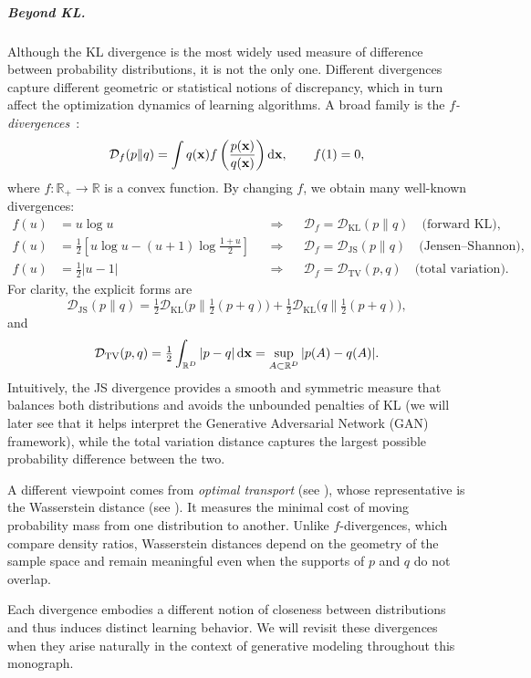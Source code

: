 \subparagraph{Beyond KL.} Although the KL divergence is the most widely used measure of difference between probability distributions, it is not the only one. Different divergences capture different geometric or statistical notions of discrepancy, which in turn affect the optimization dynamics of learning algorithms.  A broad family is the \emph{$f$-divergences}~\citep{csiszar1963informationstheoretische}:
\begin{align}\label{eq:f-div}
    \mathcal{D}_f(p\|q)
=\int q({\mathbf{x}}) f \left(\frac{p({\mathbf{x}})}{q({\mathbf{x}})}\right)\mathop{}\!\mathrm{d} {\mathbf{x}},
\qquad f(1)=0,
\end{align}
where $f:\mathbb{R}_+ \to\mathbb{R}$ is a convex function.  
By changing $f$, we obtain many well-known divergences:
\[
\begin{aligned}
f(u)&=u\log u &&\Rightarrow&& \mathcal{D}_f=\mathcal{D}_{\mathrm{KL}}(p\|q)\quad\text{(forward KL)},\\
f(u)&=\tfrac12 \left[u\log u-(u+1)\log \tfrac{1+u}{2}\right] &&\Rightarrow&& \mathcal{D}_f=\mathcal{D}_{\mathrm{JS}}(p\|q)\quad\text{(Jensen--Shannon)},\\
f(u)&=\tfrac12|u-1| &&\Rightarrow&& \mathcal{D}_f=\mathcal{D}_{\mathrm{TV}}(p,q)\quad\text{(total variation)}.
\end{aligned}
\]
For clarity, the explicit forms are
\[
\mathcal{D}_{\mathrm{JS}}(p\|q)=\tfrac12 \mathcal{D}_{\mathrm{KL}}\big(p\| \tfrac12(p+q)\big)+\tfrac12 \mathcal{D}_{\mathrm{KL}}\big(q\| \tfrac12(p+q)\big),
\]
and
\[
\mathcal{D}_{\mathrm{TV}}(p,q)=\tfrac12 \int_{\mathbb{R}^D
} |p-q|\mathop{}\!\mathrm{d} {\mathbf{x}}
=\sup_{A\subset \mathbb{R}^D } |p(A)-q(A)|.
\]
Intuitively, the JS divergence provides a smooth and symmetric measure that balances both distributions and avoids the unbounded penalties of KL (we will later see that it helps interpret the Generative Adversarial Network (GAN) framework), while the total variation distance captures the largest possible probability difference between the two.


A different viewpoint comes from \emph{optimal transport} (see ), whose representative is the Wasserstein distance (see ). It measures the minimal cost of moving probability mass from one distribution to another. Unlike $f$-divergences, which compare density ratios, Wasserstein distances depend on the geometry of the sample space and remain meaningful even when the supports of $p$ and $q$ do not overlap.

Each divergence embodies a different notion of closeness between distributions and thus induces distinct learning behavior. We will revisit these divergences when they arise naturally in the context of generative modeling throughout this monograph.







